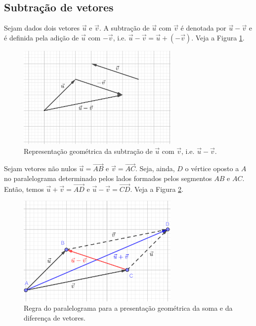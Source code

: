 \subsection{Subtração de vetores}

Sejam dados dois vetores $\vec{u}$ e $\vec{v}$. A subtração de $\vec{u}$ com $\vec{v}$ é denotada por $\vec{u}-\vec{v}$ e é definida pela adição de $\vec{u}$ com $-\vec{v}$, i.e. $\vec{u}-\vec{v}=\vec{u}+(-\vec{v})$. Veja a Figura \ref{fig:vsubtracao}.

\begin{figure}[H]
  \centering
  \includegraphics[width=0.7\textwidth]{./cap_vetor/dados/fig_vsubtracao/fig_vsubtracao}
  \caption{Representação geométrica da subtração de $\vec{u}$ com $\vec{v}$, i.e. $\vec{u}-\vec{v}$.}
  \label{fig:vsubtracao}
\end{figure}

\begin{obs}
  Sejam vetores não nulos $\vec{u} = \overrightarrow{AB}$ e $\vec{v} = \overrightarrow{AC}$. Seja, ainda, $D$ o vértice oposto a $A$ no paralelograma determinado pelos lados formados pelos segmentos $AB$ e $AC$. Então, temos $\vec{u} + \vec{v} = \overrightarrow{AD}$ e $\vec{u}-\vec{v} = \overrightarrow{CD}$. Veja a Figura \ref{fig:regrapara}.

\begin{figure}[H]
  \centering
  \includegraphics[width=0.7\textwidth]{./cap_vetor/dados/fig_regrapara/fig_regrapara}
  \caption{Regra do paralelograma para a presentação geométrica da soma e da diferença de vetores.}
  \label{fig:regrapara}
\end{figure}  
\end{obs}

